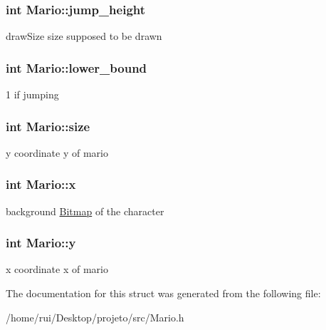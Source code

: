 \subsubsection[{\texorpdfstring{jump\+\_\+height}{jump_height}}]{\setlength{\rightskip}{0pt plus 5cm}int Mario\+::jump\+\_\+height}\hypertarget{structMario_afd661aa7602503cbf9a4d33459627e91}{}\label{structMario_afd661aa7602503cbf9a4d33459627e91}
draw\+Size size supposed to be drawn 
\subsubsection[{\texorpdfstring{lower\+\_\+bound}{lower_bound}}]{\setlength{\rightskip}{0pt plus 5cm}int Mario\+::lower\+\_\+bound}\hypertarget{structMario_afc7f287b9c802a0206696e99856f3ebf}{}\label{structMario_afc7f287b9c802a0206696e99856f3ebf}
1 if jumping 
\subsubsection[{\texorpdfstring{size}{size}}]{\setlength{\rightskip}{0pt plus 5cm}int Mario\+::size}\hypertarget{structMario_ac8a021d67049cc6c3a58892cbf3a16f9}{}\label{structMario_ac8a021d67049cc6c3a58892cbf3a16f9}
y coordinate y of mario 
\subsubsection[{\texorpdfstring{x}{x}}]{\setlength{\rightskip}{0pt plus 5cm}int Mario\+::x}\hypertarget{structMario_ac2d3305a2cc90782a8d37379ba6cdf7b}{}\label{structMario_ac2d3305a2cc90782a8d37379ba6cdf7b}
background \hyperlink{structBitmap}{Bitmap} of the character 
\subsubsection[{\texorpdfstring{y}{y}}]{\setlength{\rightskip}{0pt plus 5cm}int Mario\+::y}\hypertarget{structMario_aaf89af6928473a3413248355270bf064}{}\label{structMario_aaf89af6928473a3413248355270bf064}
x coordinate x of mario 

The documentation for this struct was generated from the following file\+:\begin{DoxyCompactItemize}
\item 
/home/rui/\+Desktop/projeto/src/Mario.\+h\end{DoxyCompactItemize}

